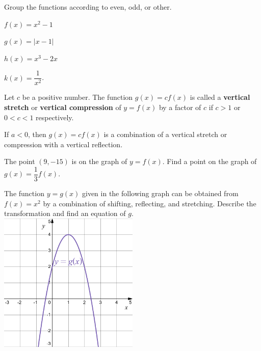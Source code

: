 \begin{example}
  Group the functions according to even, odd, or other.\\
  \begin{enumerate*}
    \item $f(x)=x^2-1$
    \item $g(x)=|x-1|$
    \item $h(x)=x^3-2x$
    \item $k(x)=\dfrac{1}{x^2}$.
  \end{enumerate*}
\end{example}

\begin{definition}
  Let $c$ be a positive number.
  The function $g(x)=cf(x)$ is called a \textbf{vertical stretch} or \textbf{vertical compression} of $y=f(x)$ by a factor of $c$ if $c>1$ or $0<c<1$ respectively.
\end{definition}
\begin{remark}
  If $a<0$, then $g(x)=cf(x)$ is a combination of a vertical stretch or compression with a vertical reflection.
\end{remark}

\begin{example}
  The point $(9, -15)$ is on the graph of $y=f(x)$. Find a point on the graph of $g(x)=\dfrac{1}{3}f(x)$.
\end{example}
\vspace*{-0.3\textheight}

\newpage
\begin{example}
  The function $y=g(x)$ given in the following graph can be obtained from $f(x)=x^2$ by a combination of shifting, reflecting, and stretching. Describe the transformation and find an equation of $g$.\\
  \includegraphics[width=0.5\textwidth]{figs/transformationquadratic.png}
\end{example}
\vspace*{-0.1\textheight}

